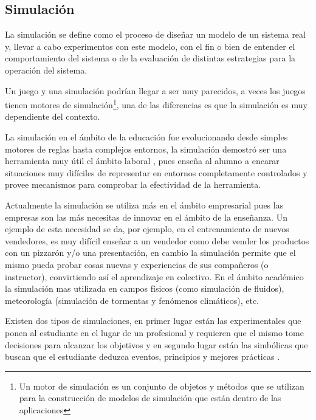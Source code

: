 
\subsection{Simulación}

La simulación se define como el proceso de diseñar un modelo de un sistema real
y, llevar a cabo experimentos con este modelo, con el fin o bien de entender el
comportamiento del sistema o de la evaluación de distintas estrategias para la
operación del sistema\cite{ingalls2008introduction}. 

Un juego y una simulación podrían llegar a ser muy parecidos, a veces los juegos
tienen motores de simulación\footnote{Un motor de simulación es un conjunto de objetos
y métodos que se utilizan para la construcción de modelos de simulación que están dentro 
de las aplicaciones}, una de las diferencias es que la simulación es muy dependiente del contexto. 

La simulación en el ámbito de la educación fue 
evolucionando desde simples motores de reglas hasta complejos entornos,
 la simulación demostró ser una herramienta muy útil el ámbito 
 laboral \cite{mariluz:seiousgames}, pues enseña al alumno a encarar 
 situaciones muy difíciles de representar en entornos completamente 
 controlados y provee mecanismos para comprobar la efectividad de la 
 herramienta. 

Actualmente la simulación se utiliza más en el ámbito empresarial pues
 las empresas son las más necesitas de innovar en el ámbito de la enseñanza. 
 Un ejemplo de esta necesidad se da, por ejemplo, en el entrenamiento de 
 nuevos vendedores, es muy difícil enseñar a un vendedor como debe vender 
 los productos con un pizzarón y/o una presentación, en cambio la 
 simulación permite que el mismo pueda probar cosas nuevas y experiencias 
 de sus compañeros (o instructor), convirtiendo así el aprendizaje en 
 colectivo\cite{mariluz:seiousgames}.
En el ámbito académico la simulación mas utilizada en campos físicos 
(como simulación de fluidos), meteorología (simulación de tormentas y 
fenómenos climáticos), etc. 

Existen dos tipos de simulaciones, en primer lugar están las experimentales que
ponen al estudiante en el lugar de un profesional y requieren que el mismo tome
decisiones para alcanzar los objetivos y en segundo lugar están las simbólicas
que buscan que el estudiante deduzca eventos, principios y mejores prácticas
\cite{charsky:2010}. 

